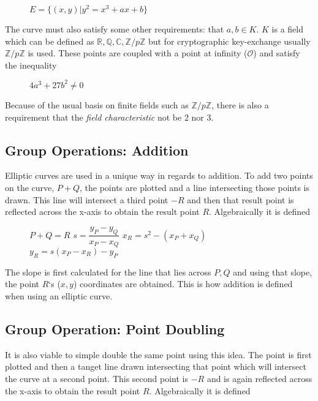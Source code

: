\documentclass[conference]{IEEEtran}
\begin{document}
\begin{figure}[h]
	\begin{center}
		$E = \{(x, y) | y^2 = x^3 + ax + b\}$
	\end{center}
\end{figure}

The curve must also satisfy some other requirements: that $a, b \in K$. $K$ is a field which can be defined as $\mathbb{R}, \mathbb{Q}, \mathbb{C}, \mathbb{Z}/p\mathbb{Z}$ but for cryptographic key-exchange usually $\mathbb{Z}/p\mathbb{Z}$ is used. These points are coupled with a point at infinity ($\mathcal{O}$) and satisfy the inequality

\begin{figure}[h]
	\begin{center}
		$4a^3 + 27b^2 \neq 0$
	\end{center}
\end{figure}

Because of the usual basis on finite fields such as $\mathbb{Z}/p\mathbb{Z}$, there is also a requirement that the \textit{field characteristic} not be 2 nor 3.

\subsection{Group Operations: Addition}
Elliptic curves are used in a unique way in regards to addition. To add two points on the curve, $P + Q$, the points are plotted and a line intersecting those points is drawn. This line will intersect a third point $-R$ and then that result point is reflected across the x-axis to obtain the result point $R$. Algebraically it is defined

\begin{figure}[h]
	\begin{center}
		$P + Q = R$ \newline
		$s = \dfrac{y_P - y_Q}{x_P - x_Q}$ \newline
		$x_R = s^2 - (x_P + x_Q)$ \newline
		$y_R = s(x_P - x_R) - y_P$ \newline
	\end{center}
\end{figure}

The slope is first calculated for the line that lies across $P, Q$ and using that slope, the point $R$`s ($x, y$) coordinates are obtained. This is how addition is defined when using an elliptic curve.

\subsection{Group Operation: Point Doubling}
It is also viable to simple double the same point using this idea. The point is first plotted and then a tanget line drawn intersecting that point which will intersect the curve at a second point. This second point is $-R$ and is again reflected across the x-axis to obtain the result point $R$. Algebraically it is defined
\end{document}
